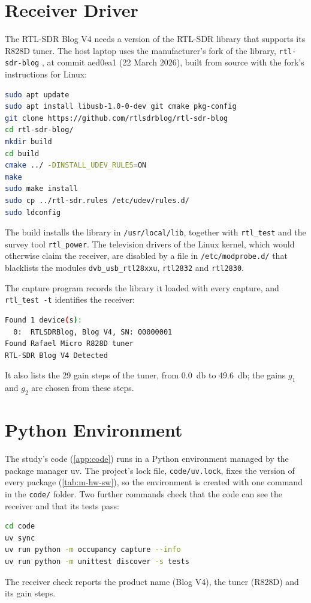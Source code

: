 \begin{singlespace}

\section{Receiver Driver}
\label{app:install-driver}

The RTL-SDR Blog V4 needs a version of the RTL-SDR library that supports its R828D tuner. The host laptop uses the manufacturer's fork of the library, \texttt{rtl-sdr-blog} \parencite{rtlsdrblog2026}, at commit aed0ea1 (22 March 2026), built from source with the fork's instructions for Linux:
\begin{lstlisting}[language=bash]
sudo apt update
sudo apt install libusb-1.0-0-dev git cmake pkg-config
git clone https://github.com/rtlsdrblog/rtl-sdr-blog
cd rtl-sdr-blog/
mkdir build
cd build
cmake ../ -DINSTALL_UDEV_RULES=ON
make
sudo make install
sudo cp ../rtl-sdr.rules /etc/udev/rules.d/
sudo ldconfig
\end{lstlisting}
The build installs the library in \texttt{/usr/local/lib}, together with \texttt{rtl\_test} and the survey tool \texttt{rtl\_power}. The television drivers of the Linux kernel, which would otherwise claim the receiver, are disabled by a file in \texttt{/etc/modprobe.d/} that blacklists the modules \texttt{dvb\_usb\_rtl28xxu}, \texttt{rtl2832} and \texttt{rtl2830}.

The capture program records the library it loaded with every capture, and \texttt{rtl\_test -t} identifies the receiver:
\begin{lstlisting}[language=bash]
Found 1 device(s):
  0:  RTLSDRBlog, Blog V4, SN: 00000001
Found Rafael Micro R828D tuner
RTL-SDR Blog V4 Detected
\end{lstlisting}
It also lists the 29 gain steps of the tuner, from \qty{0.0}{\decibel} to \qty{49.6}{\decibel}; the gains $g_1$ and $g_2$ are chosen from these steps.

\section{Python Environment}
\label{app:install-python}

The study's code (\cref{app:code}) runs in a Python environment managed by the package manager uv. The project's lock file, \texttt{code/uv.lock}, fixes the version of every package (\cref{tab:m-hw-sw}), so the environment is created with one command in the \texttt{code/} folder. Two further commands check that the code can see the receiver and that its tests pass:
\begin{lstlisting}[language=bash]
cd code
uv sync
uv run python -m occupancy capture --info
uv run python -m unittest discover -s tests
\end{lstlisting}
The receiver check reports the product name (Blog V4), the tuner (R828D) and its gain steps.


\end{singlespace}

